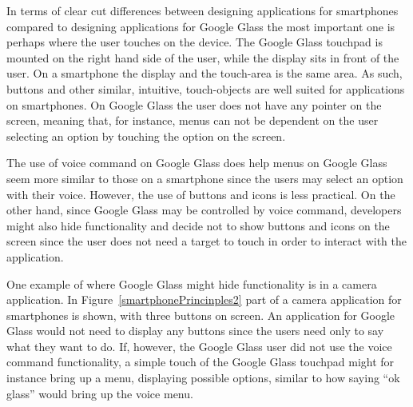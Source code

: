 


In terms of clear cut differences between designing applications for smartphones compared to designing applications for Google Glass the most important one is perhaps where the user touches on the device. The Google Glass touchpad is mounted on the right hand side of the user, while the display sits in front of the user. On a smartphone the display and the touch-area is the same area. As such, buttons and other similar, intuitive, touch-objects are well suited for applications on smartphones. On Google Glass the user does not have any pointer on the screen, meaning that, for instance, menus can not be dependent on the user selecting an option by touching the option on the screen.

The use of voice command on Google Glass does help menus on Google Glass seem more similar to those on a smartphone since the users may select an option with their voice. However, the use of buttons and icons is less practical. On the other hand, since Google Glass may be controlled by voice command, developers might also hide functionality and decide not to show buttons and icons on the screen since the user does not need a target to touch in order to interact with the application.

One example of where Google Glass might hide functionality is in a camera application. In Figure~\ref{smartphonePrincinples2} part of a camera application for smartphones is shown, with three buttons on screen. An application for Google Glass would not need to display any buttons since the users need only to say what they want to do. If, however, the Google Glass user did not use the voice command functionality, a simple touch of the Google Glass touchpad might for instance bring up a menu, displaying possible options, similar to how saying ``ok glass'' would bring up the voice menu.

